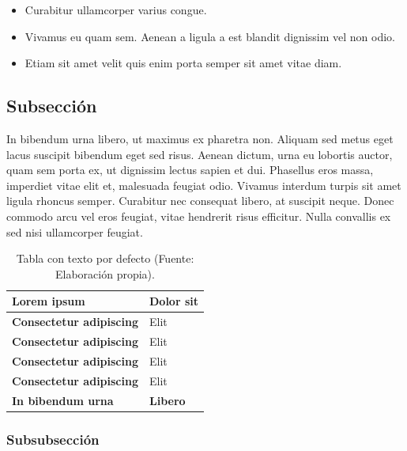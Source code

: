 \begin{itemize}
\renewcommand{\labelitemi}{$\bullet$}
\setlength{\itemindent}{5mm}
    \item Curabitur ullamcorper varius congue.
    \item Vivamus eu quam sem. Aenean a ligula a est blandit dignissim vel non odio.
    \item Etiam sit amet velit quis enim porta semper sit amet vitae diam.
\end{itemize}

\subsection{Subsección}
In bibendum urna libero, ut maximus ex pharetra non. Aliquam sed metus eget lacus suscipit bibendum eget sed risus. Aenean dictum, urna eu lobortis auctor, quam sem porta ex, ut dignissim lectus sapien et dui. Phasellus eros massa, imperdiet vitae elit et, malesuada feugiat odio. Vivamus interdum turpis sit amet ligula rhoncus semper. Curabitur nec consequat libero, at suscipit neque. Donec commodo arcu vel eros feugiat, vitae hendrerit risus efficitur. Nulla convallis ex sed nisi ullamcorper feugiat.\\

\renewcommand{\arraystretch}{1.6}
\begin{table}[]
\begin{center}
\begin{tabular}{|m{7cm}| m{7cm} |}
\hline
\rowcolor{Cyan}
\centering \textbf{Lorem ipsum} & \hspace{2.75cm} \textbf{Dolor sit} \\\hline
\textbf{Consectetur adipiscing} & Elit\\ \hline
\rowcolor{GrisTabla}
\textbf{Consectetur adipiscing} & Elit \\ \hline
\textbf{Consectetur adipiscing} & Elit \\ \hline
\rowcolor{GrisTabla} 
\textbf{Consectetur adipiscing} & Elit \\ \hline
\rowcolor{Naranja} 
\textbf{In bibendum urna} & \textbf{Libero} \\ \hline
\end{tabular}
\caption{Tabla con texto por defecto (Fuente: Elaboración propia).}
\label{Medioambiente}
\end{center}
\end{table}

\subsubsection{Subsubsección}

